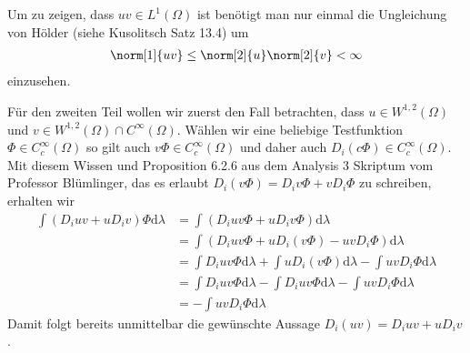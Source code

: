 \begin{solution}
    Um zu zeigen, dass $uv\in L^1(\Omega)$ ist benötigt man nur einmal die Ungleichung von Hölder (siehe Kusolitsch Satz 13.4) um
\begin{align*}
    \norm[1]{uv}\leq\norm[2]{u}\norm[2]{v}<\infty
\end{align*}
einzusehen.

Für den zweiten Teil wollen wir zuerst den Fall betrachten, dass $u\in W^{1,2}(\Omega)$ und $v\in W^{1,2}(\Omega)\cap C^\infty(\Omega)$. Wählen wir eine beliebige Testfunktion $\Phi\in C_c^\infty(\Omega)$ so gilt auch $v\Phi\in C_c^\infty(\Omega)$ und daher auch $D_i(c\Phi)\in C_c^\infty(\Omega)$. Mit diesem Wissen und Proposition 6.2.6 aus dem Analysis 3 Skriptum vom Professor Blümlinger, das es erlaubt $D_i(v\Phi)=D_iv\Phi+vD_i\Phi$ zu schreiben, erhalten wir
\begin{align*}
    \int(D_iuv+uD_iv)\Phi\mathrm{d}\lambda&=\int(D_iuv\Phi+uD_iv\Phi)\mathrm{d}\lambda\\
    &=\int(D_iuv\Phi+uD_i(v\Phi)-uvD_i\Phi)\mathrm{d}\lambda\\
    &=\int D_iuv\Phi\mathrm{d}\lambda+\int uD_i(v\Phi)\mathrm{d}\lambda-\int uvD_i\Phi\mathrm{d}\lambda\\
    &=\int D_iuv\Phi\mathrm{d}\lambda-\int D_iuv\Phi\mathrm{d}\lambda-\int uvD_i\Phi \mathrm{d}\lambda\\
    &=-\int uvD_i\Phi \mathrm{d}\lambda
\end{align*}
Damit folgt bereits unmittelbar die gewünschte Aussage $D_i(uv)=D_iuv+uD_iv$.


\end{solution}
